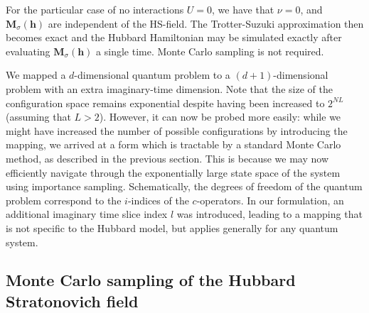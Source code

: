For the particular case of no interactions $U = 0$, we have that $\nu = 0$, and $\bm M_\sigma (\bm h)$ are independent of the HS-field. 
The Trotter-Suzuki approximation then becomes exact and the Hubbard Hamiltonian may be simulated exactly after evaluating $\bm M_\sigma (\bm h)$ a single time.
Monte Carlo sampling is not required.

We mapped a $d$-dimensional quantum problem to a $(d+1)$-dimensional  problem with an extra imaginary-time dimension.
Note that the size of the configuration space remains exponential despite having been increased to $2^{NL}$ (assuming that $L > 2$).
However, it can now be probed more easily: while we might have increased the number of possible configurations by introducing the mapping, we arrived at a form which is tractable by a standard Monte Carlo method, as described in the previous section.
This is because we may now efficiently navigate through the exponentially large state space of the system using importance sampling.
Schematically, the degrees of freedom of the quantum problem correspond to the $i$-indices of the $c$-operators.
In our formulation, an additional imaginary time slice index $l$ was introduced, leading to a mapping that is not specific to the Hubbard model, but applies generally for any quantum system.

\subsection{Monte Carlo sampling of the Hubbard Stratonovich field}
\label{subsec:mc_hs}

